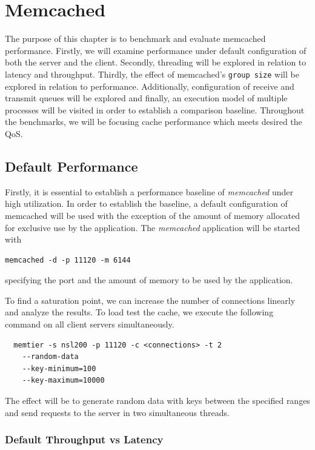 \section{Memcached}

The purpose of this chapter is to benchmark and evaluate memcached performance. Firstly, we will examine performance under default configuration of both the server and the client. Secondly, threading will be explored in relation to latency and throughput. Thirdly, the effect of memcached's \texttt{group size} will be explored in relation to performance. Additionally, configuration of receive and transmit queues will be explored and finally, an execution model of multiple processes will be visited in order to establish a comparison baseline. Throughout the benchmarks, we will be focusing cache performance which meets desired the QoS.


\subsection{Default Performance}

Firstly, it is essential to establish a performance baseline of \emph{memcached} under high utilization. In order to establish the baseline, a default configuration of memcached will be used with the exception of the amount of memory allocated for exclusive use by the application. The \emph{memcached} application will be started with
\begin{lstlisting}
memcached -d -p 11120 -m 6144
\end{lstlisting} specifying the port and the amount of memory to be used by the application.

To find a saturation point, we can increase the number of connections linearly and analyze the results. To load test the cache, we execute the following command on all client servers simultaneously.
\begin{lstlisting}
  memtier -s nsl200 -p 11120 -c <connections> -t 2
    --random-data
    --key-minimum=100
    --key-maximum=10000
\end{lstlisting}

The effect will be to generate random data with keys between the specified ranges and send requests to the server in two simultaneous threads.


\subsubsection{Default Throughput vs Latency}

